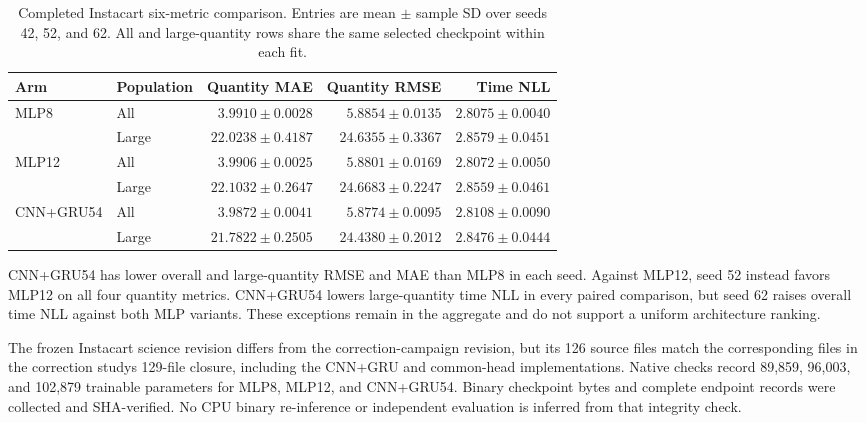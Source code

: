 \documentclass[runningheads]{llncs}
\begin{document}
\begin{table}[htbp]
\caption{Completed Instacart six-metric comparison. Entries are mean $\pm$ sample SD over seeds 42, 52, and 62. All and large-quantity rows share the same selected checkpoint within each fit.}
\label{tab:instacart-six}
\centering\small
\setlength{\tabcolsep}{3pt}
\renewcommand{\arraystretch}{1.12}
\begin{tabular}{@{}llrrr@{}}
\toprule
Arm & Population & Quantity MAE & Quantity RMSE & Time NLL\\
\midrule
MLP8 & All & $3.9910\pm0.0028$ & $5.8854\pm0.0135$ & $2.8075\pm0.0040$\\
 & Large & $22.0238\pm0.4187$ & $24.6355\pm0.3367$ & $2.8579\pm0.0451$\\
\midrule
MLP12 & All & $3.9906\pm0.0025$ & $5.8801\pm0.0169$ & $2.8072\pm0.0050$\\
 & Large & $22.1032\pm0.2647$ & $24.6683\pm0.2247$ & $2.8559\pm0.0461$\\
\midrule
CNN+GRU54 & All & $3.9872\pm0.0041$ & $5.8774\pm0.0095$ & $2.8108\pm0.0090$\\
 & Large & $21.7822\pm0.2505$ & $24.4380\pm0.2012$ & $2.8476\pm0.0444$\\
\bottomrule
\end{tabular}
\end{table}
 
CNN+GRU54 has lower overall and large-quantity RMSE and MAE than MLP8 in each seed. Against MLP12, seed 52 instead favors MLP12 on all four quantity metrics. CNN+GRU54 lowers large-quantity time NLL in every paired comparison, but seed 62 raises overall time NLL against both MLP variants. These exceptions remain in the aggregate and do not support a uniform architecture ranking.

The frozen Instacart science revision differs from the correction-campaign revision, but its 126 source files match the corresponding files in the correction study\textquotesingle s 129-file closure, including the CNN+GRU and common-head implementations. Native checks record 89,859, 96,003, and 102,879 trainable parameters for MLP8, MLP12, and CNN+GRU54. Binary checkpoint bytes and complete endpoint records were collected and SHA-verified. No CPU binary re-inference or independent evaluation is inferred from that integrity check.
\end{document}

